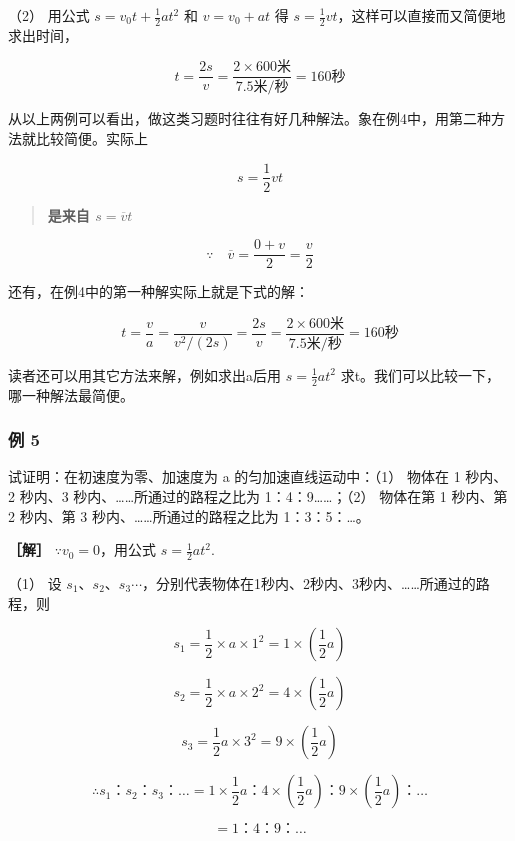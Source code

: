 （2） 用公式 \(s = v_0 t + \frac{1}{2}at^2\) 和 \(v = v_0 + at\) 得
\(s = \frac{1}{2}vt\)，这样可以直接而又简便地求出时间，

\[
t=\frac{2s}{v} =\frac{2\times600\text{米}}{7.5\text{米/秒}} =160\text{秒}
\]

从以上两例可以看出，做这类习题时往往有好几种解法。象在例4中，用第二种方法就比较简便。实际上

\[
s = \frac {1}{2} v t
\]

\begin{quote}
\textbf{是来自 \(s = \overline{v} t\)}
\end{quote}

\[
\because \quad \overline {{v}} = \frac {0 + v}{2} = \frac {v}{2}
\]

还有，在例4中的第一种解实际上就是下式的解：

\[
t=\frac{v}{a} =\frac{v}{v^{2}/(2s)} =\frac{2s}{v} =\frac{2\times600\text{米}}{7.5\text{米/秒}} =160\text{秒}
\]

读者还可以用其它方法来解，例如求出a后用 \(s=\frac{1}{2}at^{2}\)
求t。我们可以比较一下，哪一种解法最简便。

\subsubsection{例 5}\label{ux4f8b-5-2}

试证明：在初速度为零、加速度为 a 的匀加速直线运动中：（1） 物体在 1
秒内、2 秒内、3 秒内、\ldots\ldots 所通过的路程之比为
1：4：9\ldots\ldots；（2） 物体在第 1 秒内、第 2 秒内、第 3
秒内、\ldots\ldots 所通过的路程之比为 1：3：5：\ldots。

\textbf{［解］} \(\because v_{0} = 0\)，用公式 \(s = \frac{1}{2} at^2.\)

（1） 设
\(s_{1}\)、\(s_{2}\)、\(s_{3}\cdots\)，分别代表物体在1秒内、2秒内、3秒内、\ldots\ldots 所通过的路程，则

\[
s _ {1} = \frac {1}{2} \times a \times 1 ^ {2} = 1 \times \left(\frac {1}{2} a\right)
\]

\[
s _ {2} = \frac {1}{2} \times a \times 2 ^ {2} = 4 \times \left(\frac {1}{2} a\right)
\]

\[
s_3=\frac{1}{2}a\times3^2=9\times\left(\frac{1}{2}a\right)
\]

\[
\therefore s _ {1}\text{：} s _ {2}\text{：} s _ {3}\text{：} \dots = 1 \times \frac {1}{2} a\text{：} 4 \times \left(\frac {1}{2} a\right)\text{：} 9 \times \left(\frac {1}{2} a\right)\text{：} \dots
\]

\[
= 1\text{：} 4\text{：} 9\text{：} \dots
\]

